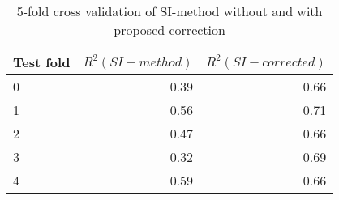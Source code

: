 \begin{table}[H]
    \centering
    \caption{5-fold cross validation of SI-method without and with proposed correction}
   \begin{tabular}{lrr}
    \toprule
        {}Test fold &  $R^2(SI-method)$ &  $R^2(SI-corrected)$ \\
        \midrule
        0 &              0.39 &                 0.66 \\
        1 &              0.56 &                 0.71 \\
        2 &              0.47 &                 0.66 \\
        3 &              0.32 &                 0.69 \\
        4 &              0.59 &                 0.66 \\
        \bottomrule
    \end{tabular}

    \label{tab:crossvalidation}
\end{table}

